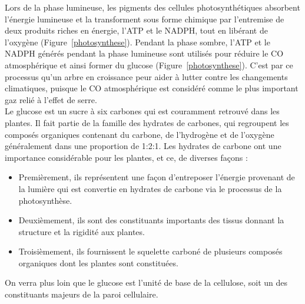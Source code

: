 Lors de la phase lumineuse, les pigments des cellules photosynthétiques absorbent l'énergie lumineuse et la transforment sous forme chimique par l'entremise de deux produits riches en énergie, l'ATP et le NADPH, tout en libérant de l'oxygène (Figure~\ref{photosynthese}). Pendant la phase sombre, l'ATP et le NADPH générés pendant la phase lumineuse sont utilisés pour réduire le CO atmosphérique et ainsi former du glucose (Figure~\ref{photosynthese}). C'est par ce processus qu'un arbre en croissance peur aider à lutter contre les changements climatiques, puisque le CO atmosphérique est considéré comme le plus important gaz relié à l'effet de serre.\\

Le glucose est un sucre à six carbones qui est couramment retrouvé dans les plantes. Il fait partie de la famille des hydrates de carbones, qui regroupent les composés organiques contenant du carbone, de l'hydrogène et de l'oxygène généralement dans une proportion de 1:2:1. Les hydrates de carbone ont une importance considérable pour les plantes, et ce, de diverses façons : 

\begin{itemize}
\item Premièrement, ils représentent une façon d'entreposer l'énergie provenant de la lumière qui est convertie en hydrates de carbone via le processus de la photosynthèse.  
\item Deuxièmement, ils sont des constituants importants des tissus donnant la structure et la rigidité aux plantes.  
\item Troisièmement, ils fournissent le squelette carboné de plusieurs composés organiques dont les plantes sont constituées.  
\end{itemize}

On verra plus loin que le glucose est l'unité de base de la cellulose, soit un des constituants majeurs de la paroi cellulaire. 

